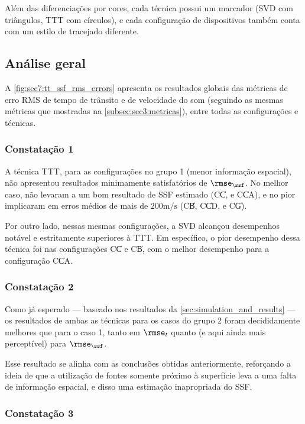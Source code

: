Além das diferenciações por cores, cada técnica possui um marcador (SVD com triângulos, TTT com círculos), e cada configuração de dispositivos também conta com um estilo de tracejado diferente.

\subsection{Análise geral}

A \cref{fig:sec7:tt_ssf_rms_errors} apresenta os resultados globais das métricas de erro RMS de tempo de trânsito e de velocidade do som (seguindo as mesmas métricas que mostradas na \cref{subsec:sec3:metricas}), entre todas as configurações e técnicas.



\subsubsection*{Constatação 1}

A técnica TTT, para as configurações no grupo 1 (menor informação espacial), não apresentou resultados minimamente satisfatórios de $\rmse_{\ssf}$. No melhor caso, não levaram a um bom resultado de SSF estimado (C\|C, e C\|CA), e no pior implicaram em erros médios de mais de $200\si{\meter/\second}$ (C\|B, C\|CD, e C\|G).

Por outro lado, nessas mesmas configurações, a SVD alcançou desempenhos notável e estritamente superiores à TTT. Em específico, o pior desempenho dessa técnica foi nas configurações C\|C e C\|B, com o melhor desempenho para a configuração C\|CA.

\subsubsection*{Constatação 2}

Como já esperado --- baseado nos resultados da \cref{sec:simulation_and_results} --- os resultados de ambas as técnicas para os casos do grupo 2 foram decididamente melhores que para o caso 1, tanto em $\rmse_t$ quanto (e aqui ainda mais perceptível) para $\rmse_{\ssf}$.

Esse resultado se alinha com as conclusões obtidas anteriormente, reforçando a ideia de que a utilização de fontes somente próximo à superfície leva a uma falta de informação espacial, e disso uma estimação inapropriada do SSF.

\subsubsection*{Constatação 3}

